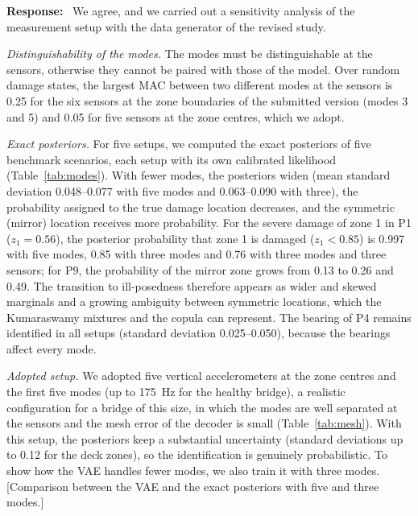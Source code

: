 \documentclass[11pt]{article}
\newenvironment{response}{\par\smallskip\noindent\color{resp}\textbf{Response:}\ }{\par}
\newcommand{\tbd}[1]{\textcolor{note}{\textsf{[#1]}}}
\begin{document}
\begin{response}
We agree, and we carried out a sensitivity analysis of the measurement setup with the data generator of the revised
study.

\textit{Distinguishability of the modes.} The modes must be distinguishable at the sensors, otherwise they cannot be
paired with those of the model. Over random damage states, the largest MAC between two different modes at the sensors is
0.25 for the six sensors at the zone boundaries of the submitted version (modes 3 and 5) and 0.05 for five sensors at the
zone centres, which we adopt.

\textit{Exact posteriors.} For five setups, we computed the exact posteriors of five benchmark scenarios, each setup with
its own calibrated likelihood (Table~\ref{tab:modes}). With fewer modes, the posteriors widen (mean standard deviation
0.048--0.077 with five modes and 0.063--0.090 with three), the probability assigned to the true damage location
decreases, and the symmetric (mirror) location receives more probability. For the severe damage of zone 1 in P1
($z_1=0.56$), the posterior probability that zone 1 is damaged ($z_1<0.85$) is 0.997 with five modes, 0.85 with three
modes and 0.76 with three modes and three sensors; for P9, the probability of the mirror zone grows from 0.13 to 0.26 and
0.49. The transition to ill-posedness therefore appears as wider and skewed marginals and a growing ambiguity between
symmetric locations, which the Kumaraswamy mixtures and the copula can represent. The bearing of P4 remains identified in
all setups (standard deviation 0.025--0.050), because the bearings affect every mode.

\textit{Adopted setup.} We adopted five vertical accelerometers at the zone centres and the first five modes (up to
175~Hz for the healthy bridge), a realistic configuration for a bridge of this size, in which the modes are well
separated at the sensors and the mesh error of the decoder is small (Table~\ref{tab:mesh}). With this setup, the
posteriors keep a substantial uncertainty (standard deviations up to 0.12 for the deck zones), so the identification is
genuinely probabilistic. To show how the VAE handles fewer modes, we also train it with three modes.
\tbd{Comparison between the VAE and the exact posteriors with five and three modes.}
\end{response}
\end{document}
